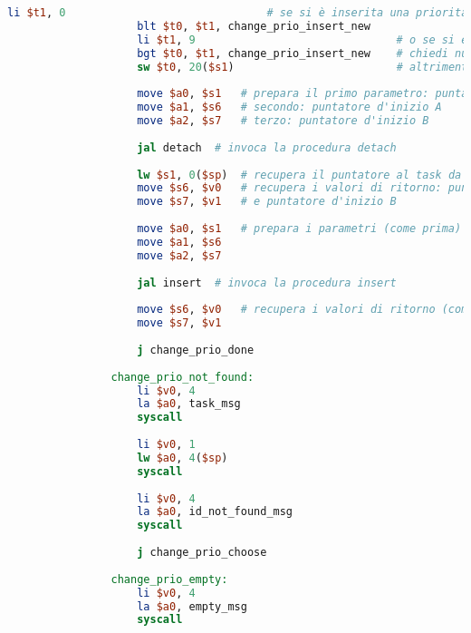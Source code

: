 \begin{center}
\begin{lstlisting}[language=mips, gobble=14, stepnumber=1]
                    li $t1, 0                               # se si è inserita una priorità minore di 0
                    blt $t0, $t1, change_prio_insert_new
                    li $t1, 9                               # o se si è inserita una priorità maggiore di 9
                    bgt $t0, $t1, change_prio_insert_new    # chiedi nuovamente la priorità del task
                    sw $t0, 20($s1)                         # altrimenti aggiorna la priorità nell'heap
                
                    move $a0, $s1   # prepara il primo parametro: puntatore al task da modificare
                    move $a1, $s6   # secondo: puntatore d'inizio A
                    move $a2, $s7   # terzo: puntatore d'inizio B
                    
                    jal detach  # invoca la procedura detach
                    
                    lw $s1, 0($sp)  # recupera il puntatore al task da modificare dallo stack
                    move $s6, $v0   # recupera i valori di ritorno: puntatore d'inizio A
                    move $s7, $v1   # e puntatore d'inizio B
                    
                    move $a0, $s1   # prepara i parametri (come prima)
                    move $a1, $s6
                    move $a2, $s7
                    
                    jal insert  # invoca la procedura insert
                    
                    move $s6, $v0   # recupera i valori di ritorno (come prima)
                    move $s7, $v1
                    
                    j change_prio_done
                
                change_prio_not_found:
                    li $v0, 4
                    la $a0, task_msg
                    syscall
                    
                    li $v0, 1
                    lw $a0, 4($sp)
                    syscall
                    
                    li $v0, 4
                    la $a0, id_not_found_msg
                    syscall
                    
                    j change_prio_choose
                    
                change_prio_empty:
                    li $v0, 4
                    la $a0, empty_msg
                    syscall
                    

\end{lstlisting}
\end{center}
